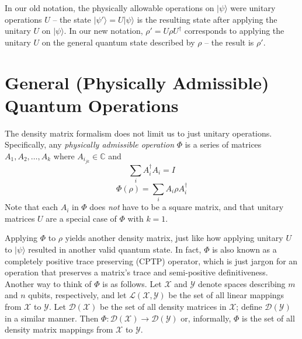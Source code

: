 \documentclass[11pt]{article}
\def\complex{\mathbb{C}}
\newcommand{\op}[2]{#1#2#1^\dag}
\newcommand{\ket}[1]{\lvert #1 \rangle}
\def\X{\mathcal{X}}
\def\Y{\mathcal{Y}}
\def\D{\mathcal{D}}
\def\L{\mathcal{L}}
\def\fill{   \hfill}
\begin{document}
\fill

\noindent In our old notation, the physically allowable operations on $\ket{\psi}$ were unitary operations $U$ -- the state $\ket{\psi'} = U\ket{\psi}$ is the resulting state after applying the unitary $U$ on $\ket{\psi}$. In our new notation, $\rho' = U\rho U^\dag$ corresponds to applying the unitary $U$ on the general quantum state described by $\rho$ -- the result is $\rho'$.

\section{General (Physically Admissible) Quantum Operations}
The density matrix formalism does not limit us to just unitary operations. Specifically, any \emph{physically admissible operation} $\Phi$ is a series of matrices $A_1, A_2, \dots, A_k$ where $A_{i_{jk}} \in \complex$ and
\begin{equation} \label{eq:phya:completeness}
\sum_{i} A^\dag_iA_i = I 
\end{equation}
\begin{equation} \label{eq:phya:app}
\Phi(\rho) = \sum_{i} \op{A_i}{\rho}
\end{equation}
Note that each $A_i$ in $\Phi$ does \emph{not} have to be a square matrix, and that unitary matrices $U$ are a special case of $\Phi$ with $k = 1$.

\noindent Applying $\Phi$ to $\rho$ yields another density matrix, just like how applying unitary $U$ to $\ket{\psi}$ resulted in another valid quantum state. In fact, $\Phi$ is also known as a completely positive trace preserving (CPTP) operator, which is just jargon for an operation that preserves a matrix's trace and semi-positive definitiveness. Another way to think of $\Phi$ is as follows. Let $\X$ and $\Y$ denote spaces describing $m$ and $n$ qubits, respectively, and let $\L(\X, \Y)$ be the set of all linear mappings from $\X$ to $\Y$. Let $\D(\X)$ be the set of all density matrices in $\X$; define $\D(\Y)$ in a similar manner. Then $\Phi : \D(\X) \rightarrow \D(\Y)$ or, informally, $\Phi$ is the set of all density matrix mappings from $\X$ to $\Y$.

\fill  
\end{document}
